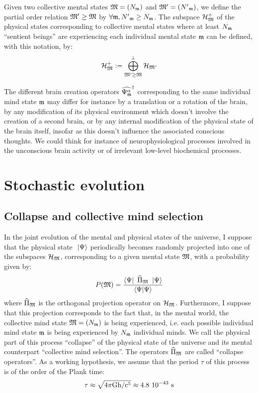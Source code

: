 \documentclass[10pt,a4paper,twoside,openany]{book}
\begin{document}
Given two collective mental states $\mathfrak{M} = ({N}_{\mathfrak{m}})$ and $\mathfrak{M}' = ({N'}_{\mathfrak{m}})$, we define the partial order relation $\mathfrak{M}' \geq \mathfrak{M}$ by $\forall \mathfrak{m}, {N'}_{\mathfrak{m}} \geq {N}_{\mathfrak{m}}$. The subspace $\mathcal H_{\mathfrak{M}}^+$ of the physical states corresponding to collective mental states where at least ${N}_{\mathfrak{m}}$ ``sentient beings'' are experiencing each individual mental state $\mathfrak{m}$ can be defined, with this notation, by:
\begin{equation*}
\mathcal H_{\mathfrak{M}}^+ := \bigoplus_{\mathfrak{M}' \geq \mathfrak{M}}^\perp \mathcal H_{\mathfrak{M}'}
\end{equation*}

 The different brain creation operators $\widehat{\Psi_{\mathfrak{m}}^\alpha}^{\dagger}$ corresponding to the same individual mind state $\mathfrak{m}$ may differ for instance by a translation or a rotation of the brain, by any modification of its physical environment which doesn't involve the creation of a second brain, or by any internal modification of the physical state of the brain itself, insofar as this doesn't influence the associated conscious thoughts. We could think for instance of neurophysiological processes involved in the unconscious brain activity or of irrelevant low-level biochemical processes.

\chapter{Stochastic evolution}
\label{Stochastic evolution}

\section{Collapse and collective mind selection}

In the joint evolution of the mental and physical states of the universe, I suppose that the physical state $\ \left|{\Psi}\right\rangle$ periodically becomes randomly projected into one of the subspaces $\mathcal H_{\mathfrak{M}}$, corresponding to a given mental state $\mathfrak{M}$, with a probability given by:
\begin{equation*}
P(\mathfrak{M}) = \frac{\left\langle{\Psi}\right|\  \widehat{\Pi}_{\mathfrak{M}} \ \left|{\Psi}\right\rangle}{\left\langle{\Psi}|{\Psi}\right\rangle}
\end{equation*}
where $\widehat{\Pi}_{\mathfrak{M}}$ is the orthogonal projection operator on $\mathcal H_{\mathfrak{M}}$. Furthermore, I suppose that this projection corresponds to the fact that, in the mental world, the collective mind state $\mathfrak{M} = ({N}_{\mathfrak{m}})$ is being experienced, i.e. each possible individual mind state $\mathfrak{m}$ is being experienced by ${N}_{\mathfrak{m}}$ individual minds. We call the physical part of this process ``collapse'' of the physical state of the universe and its mental counterpart ``collective mind selection''. The operators $\widehat{\Pi}_{\mathfrak{M}}$ are called ``collapse operators''. As a working hypothesis, we assume that the period $\tau$ of this process is of the order of the Plank time:
\begin{equation*}
\tau \approx \sqrt{4\pi\mathrm G \mathrm h/\mathrm c^5}\approx4.8~10^{-43}\ \mathrm s
\end{equation*}
\end{document}
